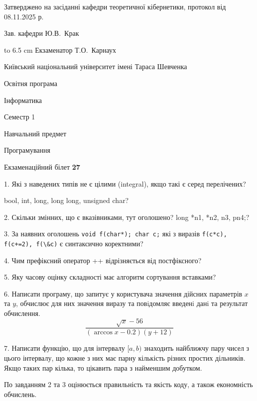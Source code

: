 \documentclass[12pt, ukrainian]{article}
\def\code#1{\Verb!#1!}
\begin{document}
{\smallskip\smallskip \begin {scriptsize} Затверджено на засіданні кафедри теоретичної кібернетики, протокол   від   08.11.2025 р.\par\smallskip\smallskip\smallskip\smallskip
{\parbox {6.5 cm} {Зав. кафедри \dotfill Ю.В.~Крак}}\hspace {0.7cm} {\hbox to 6.5 cm { Екзаменатор \dotfill Т.О.~Карнаух}} \end{scriptsize}}
\newpage
{{\begin {scriptsize}\par
{ \center  Київський національний університет імені Тараса Шевченка \par}
{\parbox {5 cm}{Освітня програма \hfill}{\parbox {7 cm}{Інформатика\hfill}}\parbox {6 cm}{\hfill Семестр 1}}\par
{\parbox {5 cm} {Навчальний предмет \hfill}\parbox {7 cm}{Програмування \hfill}\parbox {6cm}{\hfill}\par}\vspace{-15pt} \end{scriptsize}}{\center Екзаменаційний білет \No \textbf { 27 }\par}}
{%
1. Які з наведених типів не є цілими (integral), якщо такі є серед перелічених?

bool, int, long, long long, unsigned char?
\par
\vspace{2mm}
2. Скільки змінних, що є вказівниками, тут оголошено?
long *n1, *n2, n3, pn4;?
\par
\vspace{2mm}
3. За наявних оголошень \code{void f(char*); char c;} які з виразів \code{f(c*c), f(c+=2), f(\&c)} є синтаксично коректними?
\par
\vspace{2mm}
4. Чим префіксний оператор ++ відрізняється від постфіксного?
\par
\vspace{2mm}
5. Яку часову оцінку складності має алгоритм сортування вставками?
\par
\vspace{2mm}
6. Написати програму, що запитує у користувача значення дійсних параметрів $x$ та $y$, обчислює для них значення виразу та повiдомляє введенi данi та результат обчислення.
$$\frac{\sqrt x - 56}{(\arccos x - 0.2) (y + 12)}$$ 

\par
7. Написати функцію, що для інтервалу $[a, b)$ знаходить найближчу пару чисел з цього інтервалу, що кожне з них має парну кількість різних простих дільників. Якщо таких пар кілька, то цікавить пара з найменшим добутком.

По завданням 2 та 3 оцінюється правильність та якість коду, а також економність обчислень.

}
\end{document}
